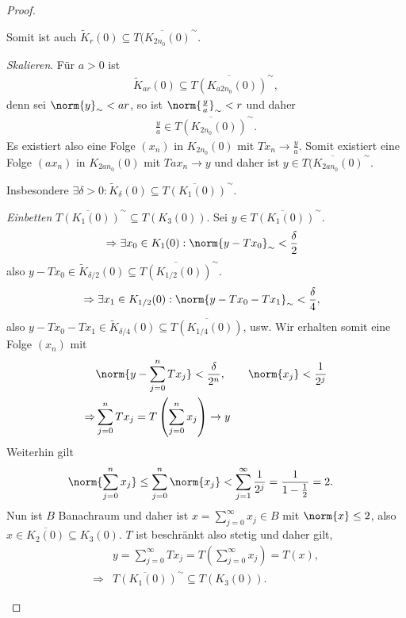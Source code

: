 \begin{proof}
\begin{proofenum}
Somit ist auch $\tilde{K}_r(0)\subseteq \overline{T(K_{2n_0}(0)}^\sim$.
\item \textit{Skalieren}. Für $a > 0$ ist
\begin{align*}
\tilde{K}_{ar}(0) \subseteq \overline{T(K_{a2n_0}(0))}^\sim,
\end{align*}
denn sei $\norm{y}_\sim < ar$, so ist $\norm{\frac{y}{a}}_\sim < r$ und daher
\begin{align*}
\frac{y}{a}\in \overline{T(K_{2n_0}(0))}^\sim.
\end{align*}
Es existiert also eine Folge $(x_n)$ in $K_{2n_0}(0)$ mit $Tx_n\to
\frac{y}{a}$. Somit  existiert eine Folge $(ax_n)$ in $K_{2an_0}(0)$ mit
$Tax_n\to y$ und daher ist $y\in \overline{T(K_{2an_0}(0)}^\sim$.

Insbesondere $\exists \delta > 0 : \tilde{K}_\delta(0) \subseteq
\overline{T(K_1(0))}^\sim$.
\item \textit{Einbetten} $\overline{T(K_1(0))}^\sim \subseteq T(K_3(0))$. Sei
$y\in \overline{T(K_1(0))}^\sim$.
\begin{align*}
&\Rightarrow \exists x_0\in K_1(0) : \norm{y-Tx_0}_\sim < \frac{\delta}{2}
\end{align*}
also $y-Tx_0\in\tilde{K}_{\delta/2}(0)\subseteq
\overline{T(K_{1/2}(0))}^\sim$.
\begin{align*}
&\Rightarrow \exists x_1\in K_{1/2}(0) : \norm{y-Tx_0-Tx_1}_\sim <
\frac{\delta}{4},
\end{align*}
also $y-Tx_0-Tx_1\in\tilde{K}_{\delta/4}(0)\subseteq \overline{T(K_{1/4}(0))}$,
usw. 
Wir erhalten somit eine Folge $(x_n)$ mit
\begin{align*}
&\norm{y-\sum_{j=0}^n Tx_j} < \frac{\delta}{2^n},\qquad
\norm{x_j} < \frac{1}{2^j}\\
\Rightarrow
&\sum_{j=0}^n Tx_j = T\left(\sum\limits_{j=0}^n x_j\right) \to y
\end{align*}
Weiterhin gilt
\begin{align*}
&\norm{\sum\limits_{j=0}^n x_j} \le
\sum\limits_{j=0}^n \norm{x_j} < \sum\limits_{j=1}^\infty \frac{1}{2^j} =
\frac{1}{1-\frac{1}{2}} = 2.
\end{align*}
Nun ist $B$ Banachraum und daher ist $x=\sum\limits_{j=0}^\infty x_j\in B$ mit
$\norm{x}\le 2$, also $x\in \overline{K_2(0)}\subseteq K_3(0)$. $T$ ist
beschränkt also stetig und daher gilt,
\begin{align*}
&y=\sum\limits_{j=0}^\infty Tx_j = T\left(\sum_{j=0}^\infty x_j\right) = T(x),\\
\Rightarrow &\overline{T(K_1(0))}^\sim \subseteq T(K_3(0)). 

\end{align*}
\end{proofenum}
\end{proof}
